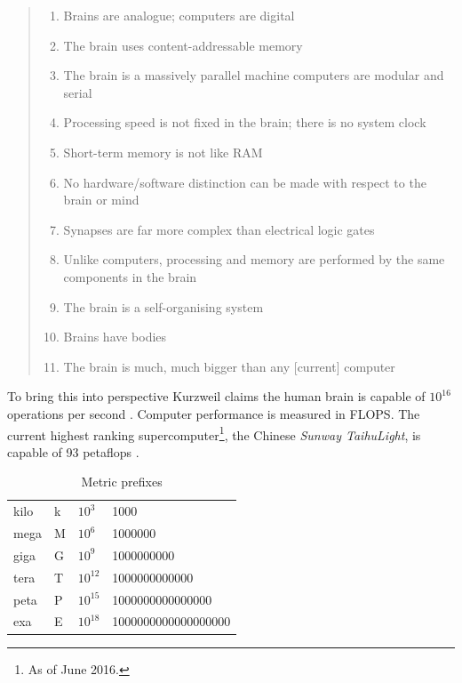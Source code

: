 \begin{quotation}
  \begin{enumerate}
    \item Brains are analogue; computers are digital
    \item The brain uses content-addressable memory
    \item The brain is a massively parallel machine computers are modular and serial
    \item Processing speed is not fixed in the brain; there is no system clock
    \item Short-term memory is not like RAM
    \item No hardware/software distinction can be made with respect to the brain or mind
    \item Synapses are far more complex than electrical logic gates
    \item Unlike computers, processing and memory are performed by the same components in the brain
    \item The brain is a self-organising system
    \item Brains have bodies
    \item	The brain is much, much bigger than any [current] computer
  \end{enumerate}
\end{quotation}

To bring this into perspective Kurzweil claims the human brain is capable of $10^{16}$ operations per second \autocite*{Kurzweil2013}. Computer performance is measured in \ac{FLOPS}. The current highest ranking supercomputer\footnote{As of June 2016.}, the Chinese \textit{Sunway TaihuLight}, is capable of 93 petaflops \autocite{Fu2016,Top2016}.

\begin{table}[!htbp]
\centering
\caption{Metric prefixes}
\label{tab:metric}
\begin{tabu}{@{}llll@{}}
\toprule
kilo & k & $10^3$    & \num{1000}                \\
mega & M & $10^6$    & \num{1000000}             \\
giga & G & $10^9$    & \num{1000000000}          \\
tera & T & $10^{12}$ & \num{1000000000000}       \\
peta & P & $10^{15}$ & \num{1000000000000000}    \\
exa  & E & $10^{18}$ & \num{1000000000000000000} \\ 
\bottomrule
\end{tabu}
\end{table}

